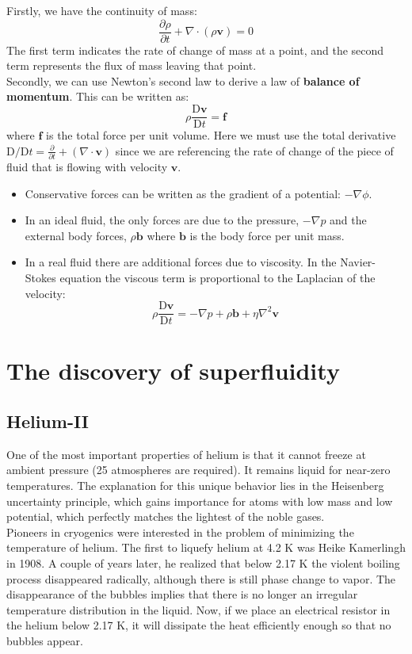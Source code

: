 \documentclass{article}
\begin{document}
Firstly, we have the continuity of mass:
\[\frac{\partial\rho}{\partial t} + \nabla\cdot(\rho\mathbf{v}) = 0\]
The first term indicates the rate of change of mass at a point, and the second
term represents the flux of mass leaving that point.
\\

Secondly, we can use Newton's second law to derive a law of
\textbf{balance of momentum}.	This can be written as:
\[\rho\frac{\mathrm{D}\mathbf{v}}{\mathrm{D} t}= \mathbf{f}\]
where $\mathbf{f}$ is the total force per unit volume.	Here we must use the
total derivative
$\mathrm{D}/\mathrm{D}t = \frac{\partial}{\partial t} + (\nabla \cdot
    \mathbf{v})$
since we are referencing the rate of change of the piece of fluid that is
flowing with velocity $\mathbf{v}$.
\begin{itemize}
    \item Conservative forces can be written as the gradient of a potential: $-\nabla\phi$.
    \item In an ideal fluid, the only forces are due to the pressure, $-\nabla p$ and the external body forces, $\rho \mathbf{b}$ where $\mathbf{b}$ is the body force per unit mass.
    \item In a real fluid there are additional forces due to viscosity. In the Navier-Stokes equation the viscous term is proportional to the Laplacian of the velocity:
\[\rho\frac{\mathrm{D}\mathbf{v}}{\mathrm{D} t}=-\nabla p + \rho \mathbf{b} +
    \eta\nabla^2{\mathbf{v}}\]
\end{itemize}


\section{The discovery of superfluidity}

\subsection{Helium-II}
One of the most important properties of helium is that it cannot freeze at ambient pressure (25 atmospheres are required). It remains liquid for near-zero temperatures. The explanation for this unique behavior lies in the Heisenberg uncertainty principle, which gains importance for atoms with low mass and low potential, which perfectly matches the lightest of the noble gases.
\\

Pioneers in cryogenics were interested in the problem of minimizing the temperature of helium. The first to liquefy helium at 4.2 K was Heike Kamerlingh in 1908. A couple of years later, he realized that below 2.17 K the violent boiling process disappeared radically, although there is still phase change to vapor. The disappearance of the bubbles implies that there is no longer an irregular temperature distribution in the liquid. Now, if we place an electrical resistor in the helium below 2.17 K, it will dissipate the heat efficiently enough so that no bubbles appear. 
\\
\end{document}
